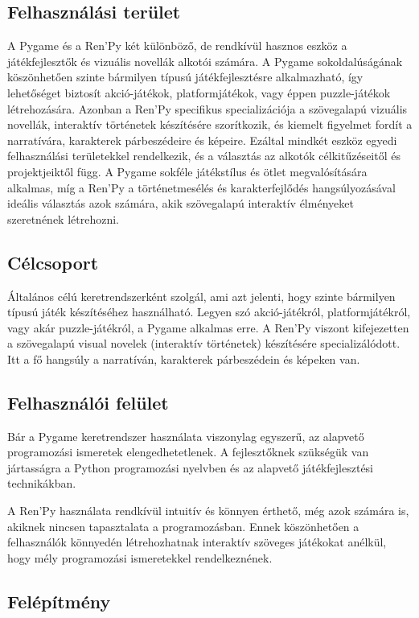 \subsection{Felhasználási terület}
A Pygame és a Ren'Py két különböző, de rendkívül hasznos eszköz a játékfejlesztők és vizuális novellák alkotói számára. A Pygame sokoldalúságának köszönhetően szinte bármilyen típusú játékfejlesztésre alkalmazható, így lehetőséget biztosít akció-játékok, platformjátékok, vagy éppen puzzle-játékok létrehozására. Azonban a Ren'Py specifikus specializációja a szövegalapú vizuális novellák, interaktív történetek készítésére szorítkozik, és kiemelt figyelmet fordít a narratívára, karakterek párbeszédeire és képeire. Ezáltal mindkét eszköz egyedi felhasználási területekkel rendelkezik, és a választás az alkotók célkitűzéseitől és projektjeiktől függ. A Pygame sokféle játékstílus és ötlet megvalósítására alkalmas, míg a Ren'Py a történetmesélés és karakterfejlődés hangsúlyozásával ideális választás azok számára, akik szövegalapú interaktív élményeket szeretnének létrehozni.

\subsection{Célcsoport}

Általános célú keretrendszerként szolgál, ami azt jelenti, hogy szinte bármilyen típusú játék készítéséhez használható. Legyen szó akció-játékról, platformjátékról, vagy akár puzzle-játékról, a Pygame alkalmas erre.
A Ren'Py viszont kifejezetten a szövegalapú visual novelek (interaktív történetek) készítésére specializálódott. Itt a fő hangsúly a narratíván, karakterek párbeszédein és képeken van.

\subsection{Felhasználói felület}

Bár a Pygame keretrendszer használata viszonylag egyszerű, az alapvető programozási ismeretek elengedhetetlenek. A fejlesztőknek szükségük van jártasságra a Python programozási nyelvben és az alapvető játékfejlesztési technikákban.

A Ren'Py használata rendkívül intuitív és könnyen érthető, még azok számára is, akiknek nincsen tapasztalata a programozásban. Ennek köszönhetően a felhasználók könnyedén létrehozhatnak interaktív szöveges játékokat anélkül, hogy mély programozási ismeretekkel rendelkeznének.
\subsection{Felépítmény}

